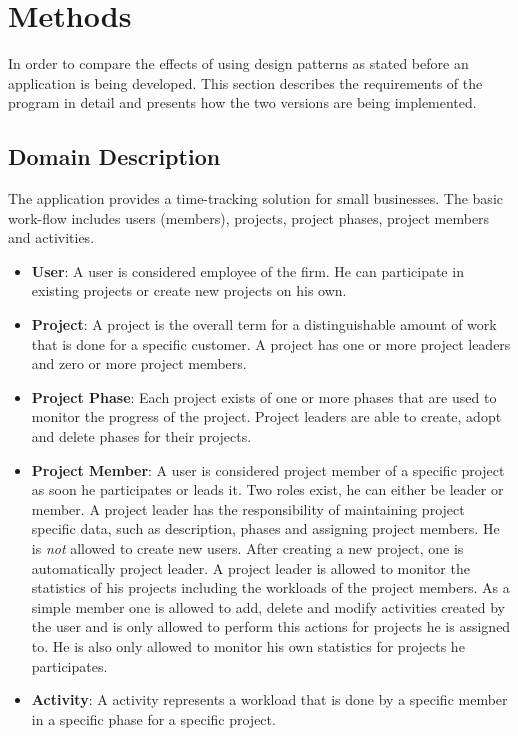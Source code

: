 \chapter{Methods}
In order to compare the effects of using design patterns as stated before an application is being developed. This section describes the requirements of the program in detail and presents how the two versions are being implemented.

\section{Domain Description}
The application provides a time-tracking solution for small businesses. The basic work-flow includes users (members), projects, project phases, project members and activities. 

\begin{itemize}
	\item \textbf{User}: A user is considered employee of the firm. He can participate in existing projects or create new projects on his own.
	\item \textbf{Project}: A project is the overall term for a distinguishable amount of work that is done for a specific customer. A project has one or more project leaders and zero or more project members.
	\item \textbf{Project Phase}: Each project exists of one or more phases that are used to monitor the progress of the project. Project leaders are able to create, adopt and delete phases for their projects. 
	\item \textbf{Project Member}: A user is considered project member of a specific project as soon he participates or leads it. Two roles exist, he can either be leader or member. A project leader has the responsibility of maintaining project specific data, such as description, phases and assigning project members. He is \emph{not} allowed to create new users. After creating a new project, one is automatically project leader. A project leader is allowed to monitor the statistics of his projects including the workloads of the project members. As a simple member one is allowed to add, delete and modify activities created by the user and is only allowed to perform this actions for projects he is assigned to. He is also only allowed to monitor his own statistics for projects he participates.
	\item \textbf{Activity}: A activity represents a workload that is done by a specific member in a specific phase for a specific project.
\end{itemize}

